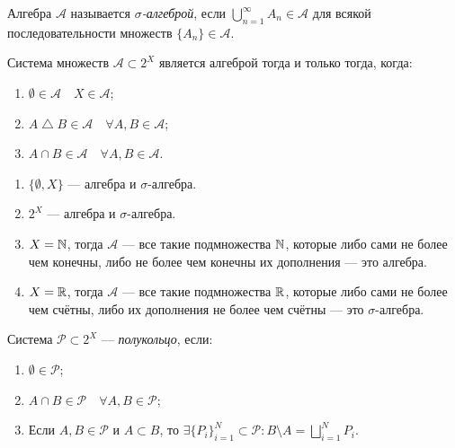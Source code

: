 \begin{definition}
    Алгебра $\mathcal{A}$ называется \textit{$\sigma$-алгеброй}, если $\bigcup\limits_{n = 1}^{\infty} A_n \in \mathcal{A}$ для всякой последовательности множеств $ \{A_n\} \in \mathcal{A}$.
\end{definition} 

\begin{remark}
    Система множеств $\mathcal{A} \subset 2^X$ является алгеброй тогда и только тогда, когда:
    \begin{enumerate}
        \item $\emptyset \in \mathcal{A} \quad X \in \mathcal{A}$;
        \item $A \bigtriangleup B \in \mathcal{A} \quad \forall A, B \in \mathcal{A}$;
        \item $A \cap B \in \mathcal{A} \quad \forall A, B \in \mathcal{A}$.
    \end{enumerate}
\end{remark}

\begin{example}
    \begin{enumerate}
        \item $\{\emptyset, X\}$ — алгебра и $\sigma$-алгебра.
        \item $2^X$ — алгебра и $\sigma$-алгебра.
        \item $X = \mathbb{N}$, тогда $\mathcal{A}$ — все такие подмножества $\mathbb{N}$, которые либо сами не более чем конечны, либо не более чем конечны их дополнения — это алгебра.
        \item $X = \mathbb{R}$, тогда $\mathcal{A}$ — все такие подмножества $\mathbb{R}$, которые либо сами не более чем счётны, либо их дополнения не более чем счётны — это $\sigma$-алгебра.
    \end{enumerate}
\end{example}

\begin{definition}
    Система $\mathcal{P} \subset 2^X$ — \textit{полукольцо}, если:
    \begin{enumerate}
        \item $\emptyset \in \mathcal{P}$;
        \item $A \cap B \in \mathcal{P} \quad \forall A, B \in \mathcal{P}$;
        \item Если $A, B \in \mathcal{P}$ и $A \subset B$, то $\exists \{P_i\}_{i = 1}^N \subset \mathcal{P}: B \setminus A = \bigsqcup\limits_{i = 1}^{N} P_i$.
    \end{enumerate}
\end{definition} 

